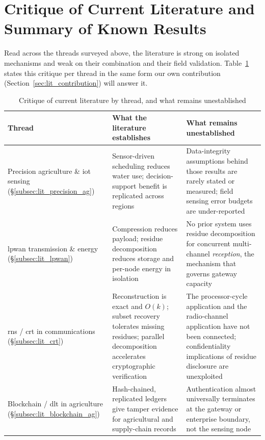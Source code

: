 \section{Critique of Current Literature and Summary of Known Results}
\label{sec:lit_critique}

Read across the threads surveyed above, the literature is strong on
isolated mechanisms and weak on their combination and their field
validation. Table~\ref{tab:lit-gap-summary} states this critique per
thread in the same form our own contribution
(Section~\ref{sec:lit_contribution}) will answer it.

\begin{table}[htbp]
\centering
\caption{Critique of current literature by thread, and what remains
         unestablished}
\label{tab:lit-gap-summary}
\footnotesize
\begin{tabularx}{\textwidth}{@{}p{}X X@{}}
\toprule
\textbf{Thread} & \textbf{What the literature establishes} & \textbf{What remains unestablished} \\
\midrule
Precision agriculture \& \gls{iot} sensing (\S\ref{subsec:lit_precision_ag})
  & Sensor-driven scheduling reduces water use; decision-support benefit is
    replicated across regions
  & Data-integrity assumptions behind those results are rarely stated or
    measured; field sensing error budgets are under-reported \\
\midrule
\gls{lpwan} transmission \& energy (\S\ref{subsec:lit_lpwan})
  & Compression reduces payload; residue decomposition reduces storage and
    per-node energy in isolation
  & No prior system uses residue decomposition for concurrent multi-channel
    \emph{reception}, the mechanism that governs gateway capacity \\
\midrule
\gls{rns} / \gls{crt} in communications (\S\ref{subsec:lit_crt})
  & Reconstruction is exact and $O(k)$; subset recovery tolerates missing
    residues; parallel decomposition accelerates cryptographic verification
  & The processor-cycle application and the radio-channel application have
    not been connected; confidentiality implications of residue disclosure
    are unexploited \\
\midrule
Blockchain / \gls{dlt} in agriculture (\S\ref{subsec:lit_blockchain_ag})
  & Hash-chained, replicated ledgers give tamper evidence for agricultural
    and supply-chain records
  & Authentication almost universally terminates at the gateway or
    enterprise boundary, not the sensing node \\

\end{tabularx}
\end{table}

